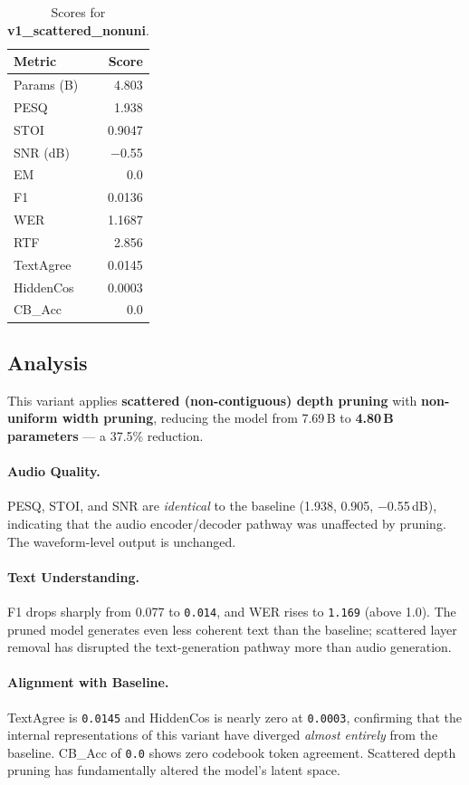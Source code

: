 \documentclass[11pt,a4paper]{article}
\newcommand{\scoreval}[1]{\texttt{#1}}
\begin{document}
\begin{table}[H]
\centering
\caption{Scores for \textbf{v1\_scattered\_nonuni}.}
\begin{tabular}{l r}
\toprule
\textbf{Metric} & \textbf{Score} \\
\midrule
Params (B)    & 4.803 \\
PESQ          & 1.938 \\
STOI          & 0.9047 \\
SNR (dB)      & $-$0.55 \\
EM            & 0.0 \\
F1            & 0.0136 \\
WER           & 1.1687 \\
RTF           & 2.856 \\
TextAgree     & 0.0145 \\
HiddenCos     & 0.0003 \\
CB\_Acc       & 0.0 \\
\bottomrule
\end{tabular}
\end{table}

\subsection{Analysis}

This variant applies \textbf{scattered (non-contiguous) depth pruning} with \textbf{non-uniform width pruning}, reducing the model from 7.69\,B to \textbf{4.80\,B parameters} — a 37.5\% reduction.

\paragraph{Audio Quality.}
PESQ, STOI, and SNR are \emph{identical} to the baseline (1.938, 0.905, $-$0.55\,dB), indicating that the audio encoder/decoder pathway was unaffected by pruning. The waveform-level output is unchanged.

\paragraph{Text Understanding.}
F1 drops sharply from 0.077 to \scoreval{0.014}, and WER rises to \scoreval{1.169} (above 1.0). The pruned model generates even less coherent text than the baseline; scattered layer removal has disrupted the text-generation pathway more than audio generation.

\paragraph{Alignment with Baseline.}
TextAgree is \scoreval{0.0145} and HiddenCos is nearly zero at \scoreval{0.0003}, confirming that the internal representations of this variant have diverged \emph{almost entirely} from the baseline. CB\_Acc of \scoreval{0.0} shows zero codebook token agreement. Scattered depth pruning has fundamentally altered the model's latent space.
\end{document}
